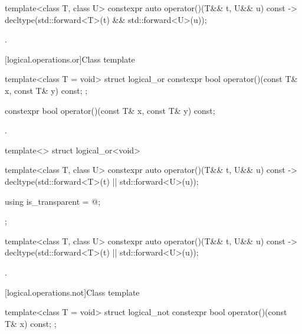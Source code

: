 %
\begin{itemdecl}
template<class T, class U> constexpr auto operator()(T&& t, U&& u) const
    -> decltype(std::forward<T>(t) && std::forward<U>(u));
\end{itemdecl}

\begin{itemdescr}
\pnum
\returns
{}.
\end{itemdescr}

[logical.operations.or]{Class template }

%
\begin{itemdecl}
template<class T = void> struct logical_or {
  constexpr bool operator()(const T& x, const T& y) const;
};
\end{itemdecl}

%
\begin{itemdecl}
constexpr bool operator()(const T& x, const T& y) const;
\end{itemdecl}

\begin{itemdescr}
\pnum
\returns
{}.
\end{itemdescr}

%
\begin{itemdecl}
template<> struct logical_or<void> {
  template<class T, class U> constexpr auto operator()(T&& t, U&& u) const
    -> decltype(std::forward<T>(t) || std::forward<U>(u));

  using is_transparent = @\unspec@;
};
\end{itemdecl}

%
\begin{itemdecl}
template<class T, class U> constexpr auto operator()(T&& t, U&& u) const
    -> decltype(std::forward<T>(t) || std::forward<U>(u));
\end{itemdecl}

\begin{itemdescr}
\pnum
\returns
{}.
\end{itemdescr}

[logical.operations.not]{Class template }

%
\begin{itemdecl}
template<class T = void> struct logical_not {
  constexpr bool operator()(const T& x) const;
};
\end{itemdecl}

